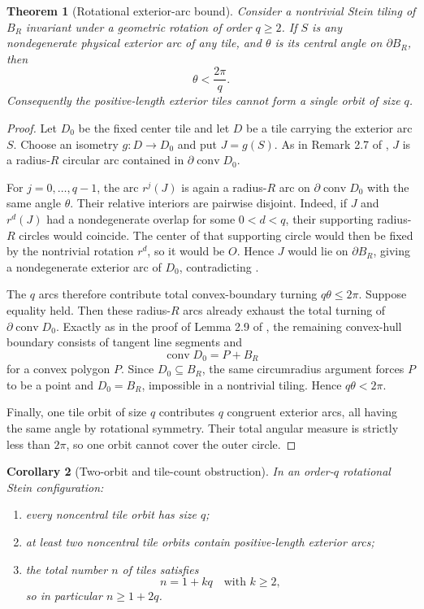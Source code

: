 \documentclass[11pt]{article}
\newtheorem{theorem}{Theorem}[section]
\newtheorem{corollary}[theorem]{Corollary}
\theoremstyle{definition}
\theoremstyle{remark}
\newcommand{\BR}{B_R}
\newcommand{\conv}{\operatorname{conv}}
\begin{document}
\begin{theorem}[Rotational exterior-arc bound]
\label{thm:rot-outer-bound}
Consider a nontrivial Stein tiling of $\BR$ invariant under a geometric rotation of order $q\ge2$.  If $S$ is any nondegenerate physical exterior arc of any tile, and $\theta$ is its central angle on $\partial\BR$, then
\[
  \theta<\frac{2\pi}{q}.
\]
Consequently the positive-length exterior tiles cannot form a single orbit of size $q$.
\end{theorem}

\begin{proof}
Let $D_0$ be the fixed center tile and let $D$ be a tile carrying the exterior arc $S$.  Choose an isometry $g:D\to D_0$ and put $J=g(S)$.  As in Remark 2.7 of \cite{KLV2020}, $J$ is a radius-$R$ circular arc contained in $\partial\conv D_0$.

For $j=0,\ldots,q-1$, the arc $r^j(J)$ is again a radius-$R$ arc on $\partial\conv D_0$ with the same angle $\theta$.  Their relative interiors are pairwise disjoint.  Indeed, if $J$ and $r^d(J)$ had a nondegenerate overlap for some $0<d<q$, their supporting radius-$R$ circles would coincide.  The center of that supporting circle would then be fixed by the nontrivial rotation $r^d$, so it would be $O$.  Hence $J$ would lie on $\partial\BR$, giving a nondegenerate exterior arc of $D_0$, contradicting .

The $q$ arcs therefore contribute total convex-boundary turning $q\theta\le2\pi$.  Suppose equality held.  Then these radius-$R$ arcs already exhaust the total turning of $\partial\conv D_0$.  Exactly as in the proof of Lemma 2.9 of \cite{KLV2020}, the remaining convex-hull boundary consists of tangent line segments and
\[
  \conv D_0=P+\BR
\]
for a convex polygon $P$.  Since $D_0\subseteq\BR$, the same circumradius argument forces $P$ to be a point and $D_0=\BR$, impossible in a nontrivial tiling.  Hence $q\theta<2\pi$.

Finally, one tile orbit of size $q$ contributes $q$ congruent exterior arcs, all having the same angle by rotational symmetry.  Their total angular measure is strictly less than $2\pi$, so one orbit cannot cover the outer circle.
\end{proof}

\begin{corollary}[Two-orbit and tile-count obstruction]
\label{cor:two-orbits}
In an order-$q$ rotational Stein configuration:
\begin{enumerate}
\item every noncentral tile orbit has size $q$;
\item at least two noncentral tile orbits contain positive-length exterior arcs;
\item the total number $n$ of tiles satisfies
\[
  n=1+kq\quad\text{with }k\ge2,
\]
so in particular $n\ge1+2q$.
\end{enumerate}
\end{corollary}
\end{document}
